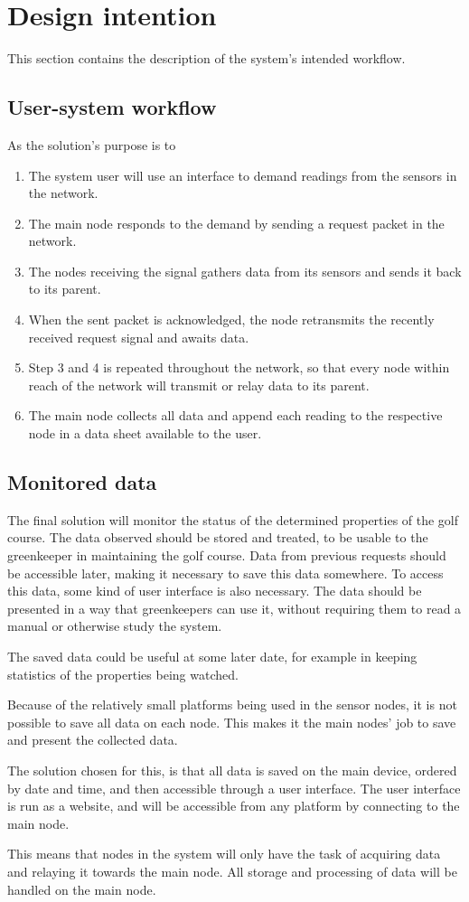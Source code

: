 \section{Design intention}
This section contains the description of the system's intended workflow. 

\subsection{User-system workflow}
As the solution's purpose is to 

\begin{enumerate}
	\item The system user will use an interface to demand readings from the sensors in the network.
	\item The main node responds to the demand by sending a request packet in the network.
	\item The nodes receiving the signal gathers data from its sensors and sends it back to its parent.
	\item When the sent packet is acknowledged, the node retransmits the recently received request signal and awaits data.
	\item Step 3 and 4 is repeated throughout the network, so that every node within reach of the network will transmit or relay data to its parent.
	\item The main node collects all data and append each reading to the respective node in a data sheet available to the user.
\end{enumerate}

\subsection{Monitored data}
The final solution will monitor the status of the determined properties of the golf course. The data observed should be stored and treated, to be usable to the greenkeeper in maintaining the golf course. Data from previous requests should be accessible later, making it necessary to save this data somewhere. To access this data, some kind of user interface is also necessary. The data should be presented in a way that greenkeepers can use it, without requiring them to read a manual or otherwise study the system. 

The saved data could be useful at some later date, for example in keeping  statistics of the properties being watched.

Because of the relatively small platforms being used in the sensor nodes, it is not possible to save all data on each node. This makes it the main nodes' job to save and present the collected data.

The solution chosen for this, is that all data is saved on the main device, ordered by date and time, and then accessible through a user interface. The user interface is run as a website, and will be accessible from any platform by connecting to the main node.

This means that nodes in the system will only have the task of acquiring data and relaying it towards the main node. All storage and processing of data will be handled on the main node.